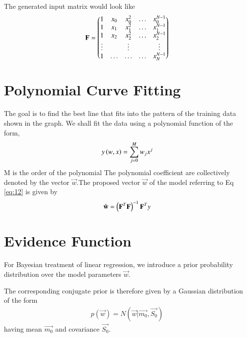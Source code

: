 \documentclass[journal,12pt,twocolumn]{IEEEtran}
\begin{document}
The generated input matrix would look like
\begin{align}
    \mathbf{F}= \begin{pmatrix} 1 & x_{0} & x_{0}^2 & \ldots & x_{0}^{N-1} \\
		1 & x_{1} & x_{1}^2 & \ldots & x_{1}^{N-1} \\
		1 & x_{2} & x_{2}^2 & \ldots & x_{2}^{N-1} \\
		\vdots & & \vdots &  & \vdots  \\
		    1 & \ldots & \ldots & \ldots & x_{N}^{N-1} \end{pmatrix}\label{eq:12}
\end{align}
\section{Polynomial Curve Fitting}
The goal is to find the best line that fits into the  pattern of the training data shown in the graph.
We shall fit the data using a polynomial function of the form, 
\begin{align}
     y\left(w,x\right)= \sum_{j=0}^{M} w_j x^{j}\\
\end{align}
M is the order of the polynomial
The polynomial coefficient are collectively denoted by the vector $\vec{w}$.The proposed vector $\vec{w}$ of the model referring to Eq \eqref{eq:12} is given by 
\begin{align}
    \hat{\mathbf{w}} = \left(\mathbf{F}^T\mathbf{F}\right)^{-1}\mathbf{F}^Ty \label{eq:13}
\end{align}

\section{Evidence Function}
For Bayesian treatment of linear regression, we introduce a prior probability distribution over the model parameters $\vec{w}$.

The corresponding conjugate prior is therefore given by a Gaussian
distribution of the form
\begin{align}
    p(\vec{w}) = N(\vec{w} | \vec{m_{0}},\vec{S_{0}})
\end{align}
having mean $\vec{m_{0}}$ and covariance $\vec{S_{0}}$.
\end{document}
